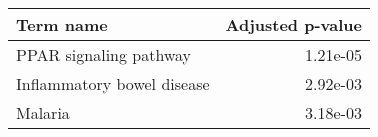 \begin{tabular}{lr}
\toprule
                 Term name &  Adjusted p-value \\
\midrule
    PPAR signaling pathway &          1.21e-05 \\
Inflammatory bowel disease &          2.92e-03 \\
                   Malaria &          3.18e-03 \\
\bottomrule
\end{tabular}
